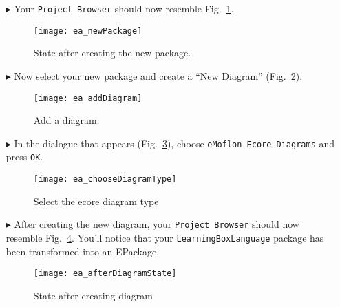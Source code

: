 \begin{itemize}
\vspace{0.5cm}

\item[$\blacktriangleright$] Your \texttt{Project Browser} should now resemble Fig.~\ref{fig:new_package_completed}.

\vspace{0.5cm}

\begin{figure}[htbp]
	\centering
  \texttt{[image: ea\_newPackage]}
	\caption{State after creating the new package.}
	\label{fig:new_package_completed}
\end{figure}
\FloatBarrier


\vspace{0.5cm}

\item[$\blacktriangleright$] Now select your new package and create a ``New Diagram'' (Fig.~\ref{fig:diagram}).

\vspace{0.5cm}

\begin{figure}[htbp]
	\centering
  \texttt{[image: ea\_addDiagram]}
	\caption{Add a diagram.}
	\label{fig:diagram}
\end{figure}
\FloatBarrier

\clearpage

\item[$\blacktriangleright$] In the dialogue that appears (Fig.~\ref{fig:diagram_type}), choose \texttt{eMoflon Ecore Diagrams} and press \texttt{OK}. 

\begin{figure}[htbp]
	\centering
  \texttt{[image: ea\_chooseDiagramType]}
	\caption{Select the ecore diagram type}
	\label{fig:diagram_type}
\end{figure}
\FloatBarrier

 
\item[$\blacktriangleright$] After creating the new diagram, your  \texttt{Project Browser} should now resemble Fig.~\ref{fig:diagram_completed}. You'll notice
that your \texttt{LearningBoxLanguage} package has been transformed into an EPackage.

\begin{figure}[htbp]
	\centering
  \texttt{[image: ea\_afterDiagramState]}
	\caption{State after creating diagram}
	\label{fig:diagram_completed}
\end{figure}
\FloatBarrier


\end{itemize}
